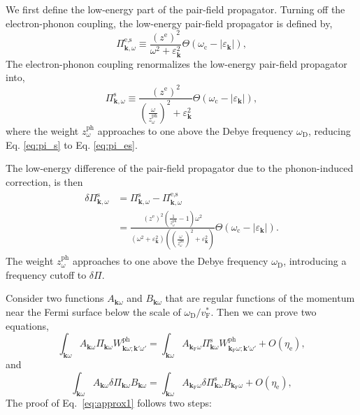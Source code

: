 \documentclass[%
 reprint,
superscriptaddress,
 amsmath,amssymb,
 aps,
prx,
]{revtex4-2}
\newcommand{\bk}{\mathbf{k}}
\newcommand{\txc}{\text{c}}
\newcommand{\txe}{\text{e}}
\newcommand{\txs}{\text{s}}
\newcommand{\txD}{\text{D}}
\newcommand{\txF}{\text{F}}
\newcommand{\txph}{\text{ph}}
\begin{document}
\begin{appendices}
We first define the low-energy part of the pair-field propagator. Turning off the electron-phonon coupling, the low-energy pair-field propagator is defined by,
\begin{equation}
\label{eq:pi_es}
    \Pi^{\txe,\txs}_{\bk,\omega} \equiv \frac{(z^{\txe})^2}{\omega^2 + \varepsilon_{\bk}^2}\Theta(\omega_\txc-|\varepsilon_{\bk}|), 
\end{equation}
The electron-phonon coupling renormalizes the low-energy pair-field propagator into,
\begin{equation}
\label{eq:pi_s}
    \Pi^{\txs}_{\bk,\omega} \equiv \frac{(z^{\txe})^{2}}{\left(\frac{\omega}{z^{\txph}_\omega}\right)^2 + \varepsilon_{\bk}^2}\Theta(\omega_\txc-|\varepsilon_{\bk}|), 
\end{equation}
where the weight $z^{\txph}_\omega$ approaches to one above the Debye frequency $\omega_\txD$, reducing Eq. \eqref{eq:pi_s} to Eq. \eqref{eq:pi_es}.

The low-energy difference of the pair-field propagator due to the phonon-induced
correction, is then
\begin{eqnarray}
\begin{split}
  \delta\Pi^{\txs}_{\bk,\omega} &= \Pi^{\txs}_{\bk,\omega} -\Pi^{\txe,\txs}_{\bk,\omega}\\
  &=\frac{(z^{\txe})^2\left(\frac{1}{{z^{\txph}_\omega}}-1\right)\omega^2}{(\omega^2+\varepsilon_{\bk}^2)\left(\left(\frac{\omega}{z^{\txph}_\omega}\right)^2+\varepsilon_{\bk}^2\right)}\Theta(\omega_\txc-|\varepsilon_{\bk}|).
\end{split}
\end{eqnarray}
The weight $z^{\txph}_\omega$ approaches to one above the Debye frequency $\omega_\txD$, introducing a frequency cutoff to $\delta \Pi$.

Consider two functions $A_{\bk\omega}$ and $B_{\bk\omega}$ that are regular functions of the momentum near the Fermi surface below the scale of $\omega_\txD/v_{\txF}^*$. Then we can prove two equations,
\begin{equation}
\label{eq:approx1}
    \int_{\bk\omega} A_{\bk\omega}\Pi_{\bk\omega}W^{\txph}_{\bk\omega; \bk'\omega'} = \int_{\bk\omega} A_{\bk_{\txF}\omega}\Pi^{\txs}_{\bk\omega}W^{\txph}_{\bk_{\txF}\omega; \bk'\omega'} + O(\eta_\txe),
\end{equation}
and
\begin{equation}
\label{eq:approx2}
    \int_{\bk\omega} A_{\bk\omega}\delta \Pi_{\bk\omega}B_{\bk\omega} = \int_{\bk\omega} A_{\bk_{\txF}\omega} \delta \Pi^{\txs}_{\bk\omega} B_{\bk_{\txF}\omega}  + O(\eta_\txe),
\end{equation}
The proof of Eq.~\eqref{eq:approx1} follows two steps:


\end{appendices}
\end{document}
